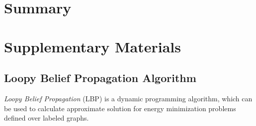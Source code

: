 \documentclass[notitlepage,english]{hgbreport}
\newcommand{\Acronym}[1]{{#1}}
\newcommand{\LBP}{\Acronym{LBP}}
\begin{document}
\subsection{\ComputeEnergy}
\subsection{\Estimate}
\subsection{\Lbp}
\subsection{\Utils}
\subsection{\Params}






\chapter{Summary}



\appendix %


\chapter{Supplementary Materials}


\section{Loopy Belief Propagation Algorithm}
\label{app:LBP}
\emph{Loopy Belief Propagation} (\LBP) \cite{Felzenszwalb2006} is a dynamic programming algorithm, which can be used to calculate approximate solution for energy minimization problems defined over labeled graphs. 
\end{document}
